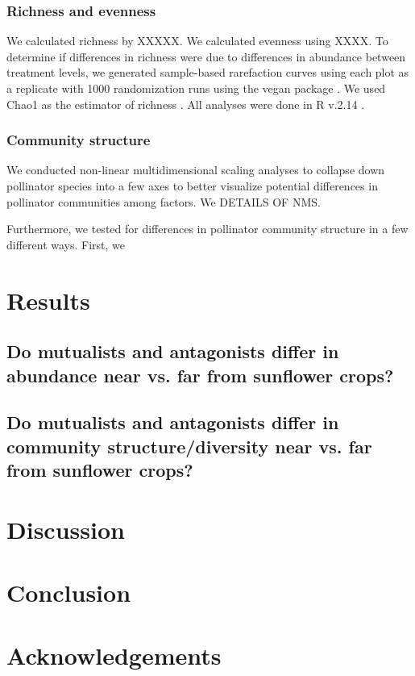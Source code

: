 \documentclass[12pt]{article}
\begin{document}
\subsubsection{Richness and evenness}
We calculated richness by XXXXX.  We calculated evenness using XXXX.  To determine if differences in richness were due to differences in abundance between treatment levels, we generated sample-based rarefaction curves using each plot as a replicate with 1000 randomization runs using the vegan package \citep{Oksanen2010}.  We used Chao1 as the estimator of richness \citep{Chao1984}.  All analyses were done in R v.2.14 \citep*{Team2008}.

\subsubsection{Community structure}
We conducted non-linear multidimensional scaling analyses to collapse down pollinator species into a few axes to better visualize potential differences in pollinator communities among factors.  We DETAILS OF NMS.

Furthermore, we tested for differences in pollinator community structure in a few different ways.  First, we 

\section{Results}
\subsection{Do mutualists and antagonists differ in abundance near vs. far from sunflower crops?}

\subsection{Do mutualists and antagonists differ in community structure/diversity near vs. far from sunflower crops?}


\section{Discussion}

\section{Conclusion}

\section{Acknowledgements}
\end{document}
